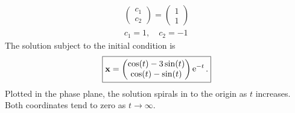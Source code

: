 \begin{Solution}
\begin{gather*}
\begin{pmatrix}
      c_1 \\
      c_2
    \end{pmatrix}
    =
    \begin{pmatrix}
      1 \\
      1
    \end{pmatrix} \\
    c_1 = 1, \quad c_2 = -1
  \end{gather*}
  The solution subject to the initial condition is
  \[
  \boxed{
    \mathbf{x} = 
    \begin{pmatrix} \cos(t) - 3 \sin(t) \\
      \cos(t) - \sin(t) \end{pmatrix} \mathop{\mathrm{e}}\nolimits^{-t}.
    }
  \]
  Plotted in the phase plane, the solution spirals in to the origin as $t$ 
  increases.  Both coordinates tend to zero as $t \to \infty$.
\end{Solution}











